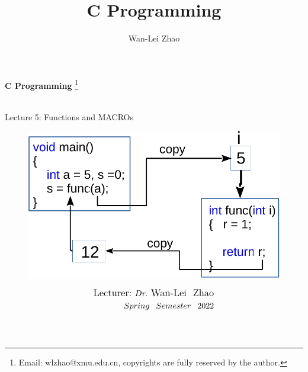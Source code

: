 \documentclass[]{beamer}
\title{C Programming}
\author{Wan-Lei Zhao}
\newcommand\blfootnote[1]{
  \begingroup
  \renewcommand\thefootnote{}\footnote{#1}
  \addtocounter{footnote}{-1}
  \endgroup
}
\begin{document}
\begin{frame}
   \begin{center}
    \vspace{24pt}
    \Huge\textbf{C Programming}\blfootnote{Email: wlzhao@xmu.edu.cn, copyrights are fully reserved by the author.}\\
     \Huge{Lecture 5: Functions and MACROs}
    \begin{figure}
    	\begin{center}
    		\includegraphics[width=0.32\linewidth]{figs/arg2para0.pdf}
    	\end{center}
    \end{figure}
  \end{center}
  \begin{align*}
   \vspace{18pt}
      \large{\mbox{Lecturer:}~Dr.~\mbox{Wan-Lei~~Zhao}} \\
      \large{Spring~~Semester~~2022} \\
   \vspace{30pt}
  \end{align*}
\end{frame}






\section{}
\end{document}
